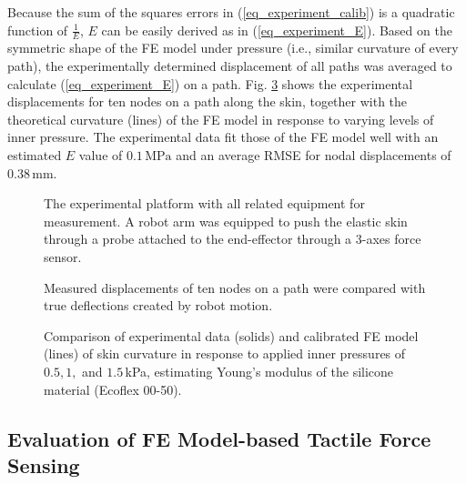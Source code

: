 \documentclass[10pt,letterpaper,journal,final,twoside,twocolumn,nofonttune]{IEEEtran}
\begin{document}
Because the sum of the squares errors in (\ref{eq_experiment_calib}) is a quadratic function of $\frac{1}{E}$, $E$ can be easily derived as in (\ref{eq_experiment_E}). 
Based on the symmetric shape of the FE model under pressure (i.e., similar curvature of every path), the experimentally determined displacement of all paths was averaged to calculate (\ref{eq_experiment_E}) on a path. Fig. \ref{fig_calibration} shows the experimental displacements for ten nodes on a path along the skin, together with the theoretical curvature (lines) of the FE model in response to varying levels of inner pressure. The experimental data fit those of the FE model well with an estimated $E$ value of $0.1\,\text{MPa}$ and an average RMSE for nodal displacements of $0.38\,\text{mm}$.
\begin{figure}[!t]
\def\svgwidth{1\columnwidth}

\caption{The experimental platform with all related equipment for measurement. A robot arm was equipped to push the elastic skin through a probe attached to the end-effector through a 3-axes force sensor.}
\label{fig_experiment}
\end{figure}
\begin{figure}[!t]
\def\svgwidth{1\columnwidth}

\caption{Measured displacements of ten nodes on a path were compared with true deflections created by robot motion.}
\label{fig_accurancy}
\end{figure}
\begin{figure}[!t]
\def\svgwidth{1\columnwidth}

\caption{Comparison of experimental data (solids) and calibrated FE model (lines) of skin curvature in response to applied inner pressures of $0.5,1,$ and $1.5$\,kPa, estimating Young's modulus of the silicone material (Ecoflex 00-50).}
\label{fig_calibration}
\end{figure} 
\subsection{Evaluation of FE Model-based Tactile Force Sensing}
\end{document}
